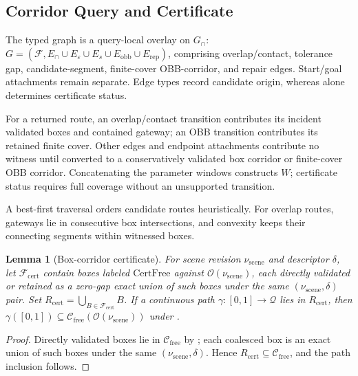 \documentclass[journal]{IEEEtran}
\newtheorem{lemma}{Lemma}
\newcommand{\Cfree}{\ensuremath{\mathcal{C}_{\mathrm{free}}}}
\newcommand{\calO}{\ensuremath{\mathcal{O}}}
\newcommand{\Q}{\ensuremath{\mathcal{Q}}}
\begin{document}
\subsection{Corridor Query and Certificate}
\label{sec:forest_graph}

The typed graph is a query-local overlay on $G_\cap$:
$G=(\mathcal{F},E_{\cap}\cup E_{\varepsilon}\cup E_s\cup
E_{\mathrm{obb}}\cup E_{\mathrm{rep}})$, comprising overlap/contact, tolerance
gap, candidate-segment, finite-cover OBB-corridor, and repair edges. Start/goal
attachments remain separate. Edge types record candidate origin, whereas
 alone determines certificate status.

For a returned route, an overlap/contact transition contributes its incident
validated boxes and contained gateway; an OBB transition contributes its
retained finite cover. Other edges and endpoint attachments contribute no
witness until converted to a conservatively validated box corridor or
finite-cover OBB corridor. Concatenating the parameter windows constructs
$W$; certificate status requires full coverage without an unsupported transition.

A best-first traversal orders candidate routes heuristically. For overlap
routes, gateways lie in consecutive box intersections, and convexity keeps
their connecting segments within witnessed boxes.

\begin{lemma}[Box-corridor certificate]
\label{lem:corridor_certificate}
For scene revision $\nu_{\mathrm{scene}}$ and descriptor $\delta$, let
$\mathcal{F}_{\mathrm{cert}}$ contain boxes labeled $\mathrm{CertFree}$ against
$\calO(\nu_{\mathrm{scene}})$, each directly validated or retained as a
zero-gap exact union of such boxes under the same
$(\nu_{\mathrm{scene}},\delta)$ pair. Set
$R_{\mathrm{cert}}=\bigcup_{B\in\mathcal{F}_{\mathrm{cert}}}B$. If a continuous
path $\gamma:[0,1]\to\Q$ lies in $R_{\mathrm{cert}}$, then
$\gamma([0,1])\subseteq\Cfree(\calO(\nu_{\mathrm{scene}}))$ under
.
\end{lemma}

\begin{proof}
Directly validated boxes lie in $\Cfree$ by ; each
coalesced box is an exact union of such boxes under the same
$(\nu_{\mathrm{scene}},\delta)$. Hence
$R_{\mathrm{cert}}\subseteq\Cfree$, and the path inclusion follows.
\end{proof}
\end{document}
